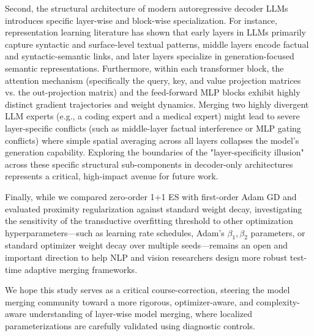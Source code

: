 Second, the structural architecture of modern autoregressive decoder LLMs introduces specific layer-wise and block-wise specialization. For instance, representation learning literature has shown that early layers in LLMs primarily capture syntactic and surface-level textual patterns, middle layers encode factual and syntactic-semantic links, and later layers specialize in generation-focused semantic representations. Furthermore, within each transformer block, the attention mechanism (specifically the query, key, and value projection matrices vs. the out-projection matrix) and the feed-forward MLP blocks exhibit highly distinct gradient trajectories and weight dynamics. Merging two highly divergent LLM experts (e.g., a coding expert and a medical expert) might lead to severe layer-specific conflicts (such as middle-layer factual interference or MLP gating conflicts) where simple spatial averaging across all layers collapses the model's generation capability. Exploring the boundaries of the "layer-specificity illusion" across these specific structural sub-components in decoder-only architectures represents a critical, high-impact avenue for future work.

Finally, while we compared zero-order 1+1 ES with first-order Adam GD and evaluated proximity regularization against standard weight decay, investigating the sensitivity of the transductive overfitting threshold to other optimization hyperparameters---such as learning rate schedules, Adam's $\beta_1, \beta_2$ parameters, or standard optimizer weight decay over multiple seeds---remains an open and important direction to help NLP and vision researchers design more robust test-time adaptive merging frameworks.

We hope this study serves as a critical course-correction, steering the model merging community toward a more rigorous, optimizer-aware, and complexity-aware understanding of layer-wise model merging, where localized parameterizations are carefully validated using diagnostic controls.
